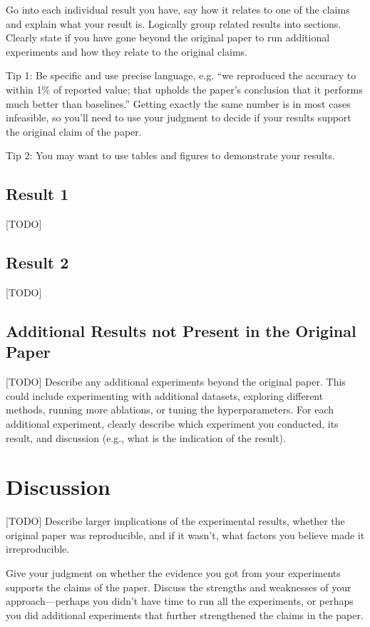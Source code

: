 \documentclass{article}
\begin{document}
Go into each individual result you have, say how it relates to one of the claims and explain what your result is. Logically group related results into sections. Clearly state if you have gone beyond the original paper to run additional experiments and how they relate to the original claims. 

Tip 1: Be specific and use precise language, e.g. ``we reproduced the accuracy to within 1\% of reported value; that upholds the paper's conclusion that it performs much better than baselines.'' Getting exactly the same number is in most cases infeasible, so you'll need to use your judgment to decide if your results support the original claim of the paper. 

Tip 2: You may want to use tables and figures to demonstrate your results.


\subsection{Result 1}
[TODO]
\subsection{Result 2}
[TODO]
\subsection{Additional Results not Present in the Original Paper}

[TODO] Describe any additional experiments beyond the original paper. This could include experimenting with additional datasets, exploring different methods, running more ablations, or tuning the hyperparameters. For each additional experiment, clearly describe which experiment you conducted, its result, and discussion (e.g., what is the indication of the result).

\section{Discussion}

[TODO] Describe larger implications of the experimental results, whether the original paper was reproducible, and if it wasn’t, what factors you believe made it irreproducible. 

Give your judgment on whether  the evidence you got from your experiments supports the claims of the paper. Discuss the strengths and weaknesses of your approach---perhaps you didn't have time to run all the experiments, or perhaps you did additional experiments that further strengthened the claims in the paper.
\end{document}

